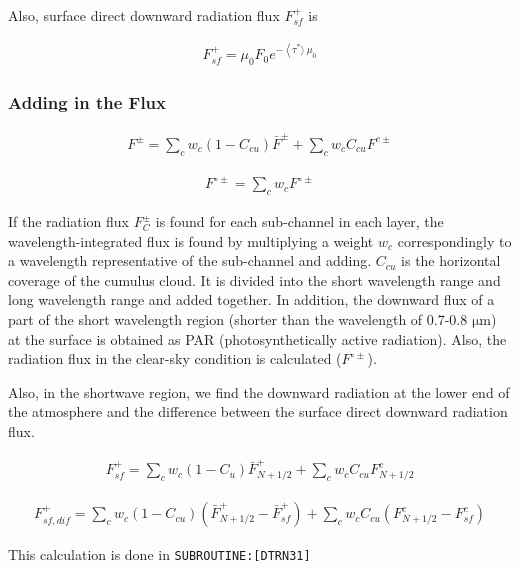 Also, surface direct downward radiation flux \(F_{s f}^{+}\) is

\begin{eqnarray}
F_{s f}^{+}=\mu_{0} F_{0} e^{-\left\langle\tau^{*}\rangle\ \mu_{0}\right.}
\end{eqnarray}

\hypertarget{adding-in-the-flux}{%
\subsubsection{Adding in the Flux}\label{adding-in-the-flux}}

\begin{eqnarray}
F^{\pm}=\sum_{c} w_{c}\left(1-C_{c u}\right) \bar{F}^{\pm}+\sum_{c} w_{c} C_{c u} F^{c \pm}
\end{eqnarray}

\begin{eqnarray}
F^{\circ \pm}=\sum_{c} w_{c} F^{\circ \pm}
\end{eqnarray}

If the radiation flux \(F_{C}^{\pm}\) is found for each sub-channel in each layer, the wavelength-integrated flux is found by multiplying a weight \(w_c\) correspondingly to a wavelength
representative of the sub-channel and adding. \(C_{cu}\) is the horizontal coverage of the cumulus cloud. It is divided into the short wavelength range and long wavelength range and added together. In
addition, the downward flux of a part of the short wavelength region (shorter than the wavelength of 0.7-0.8 \(\mathrm{{\mu}m}\)) at the surface is obtained as PAR (photosynthetically active
radiation). Also, the radiation flux in the clear-sky condition is calculated (\(F^{\circ \pm}\)).

Also, in the shortwave region, we find the downward radiation at the lower end of the atmosphere and the difference between the surface direct downward radiation flux.

\begin{eqnarray}
F_{s f}^{+}=\sum_{c} w_{c}\left(1-C_{u}\right) \bar{F}_{N+1 / 2}^{+}+\sum_{c} w_{c} C_{c u} F_{N+1 / 2}^{c}
\end{eqnarray}

\begin{eqnarray}
F_{s f, d i f}^{+}=\sum_{c} w_{c}\left(1-C_{c u}\right)\left(\bar{F}_{N+1 / 2}^{+}-\bar{F}_{s f}^{+}\right)+\sum_{c} w_{c} C_{c u}\left(F_{N+1 / 2}^{c}-F_{s f}^{c}\right)
\end{eqnarray}

This calculation is done in \texttt{SUBROUTINE:{[}DTRN31{]}}

